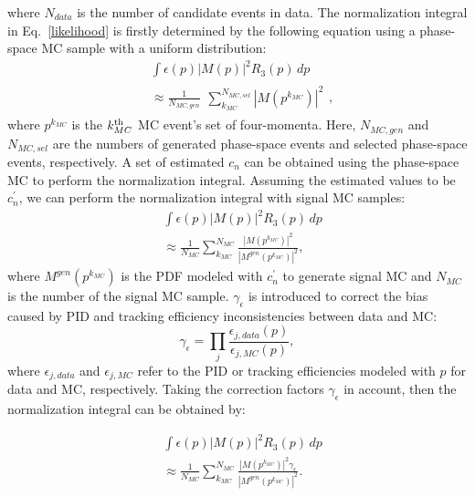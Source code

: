\documentclass[aps,prd,twocolumn,showpacs,amsmath,amssymb]{revtex4-1}
\begin{document}
where $N_{data}$ is the number of candidate events in data.
The normalization integral in Eq.~\ref{likelihood} is firstly determined by the following equation using a phase-space MC sample with a uniform distribution:
\begin{equation}
    \begin{aligned}
        &\int \epsilon(p)\left|M(p)\right|^{2}R_{3}(p)\,dp \\ 
        &\approx \frac{1}{N_{MC,gen}} \begin{matrix}\sum_{k_{MC}}^{N_{MC,sel}} \left|M(p^{k_{MC}})\right|^{2}\end{matrix},
    \end{aligned}
    \label{MC-intergral}
\end{equation}
where $p^{k_{MC}}$ is the $k_{MC}^{\rm th}$ MC event's set of four-momenta.
Here, $N_{MC,gen}$ and $N_{MC,sel}$ are the numbers of generated phase-space events and selected phase-space events, respectively.
A set of estimated $c_{n}$ can be obtained using the phase-space MC to perform the normalization integral.
Assuming the estimated values to be $c_{n}^{'}$, we can perform the normalization integral with signal MC samples:
\begin{equation}
    \begin{aligned}
        &\int \epsilon(p)\left|M(p)\right|^{2}R_{3}(p)\,dp \\ 
        &\approx \frac{1}{N_{MC}} \sum_{k_{MC}}^{N_{MC}} \frac{\left|M(p^{k_{MC}})\right|^{2}} { \left|M^{gen}(p^{k_{MC}})\right|^{2} }, 
    \end{aligned}
\label{sig-MC-intergral}
\end{equation}
where $M^{gen}(p^{k_{MC}})$ is the PDF modeled with $c_{n}^{'}$ to generate signal MC and $N_{MC}$ is the number of the signal MC sample.
$\gamma_{\epsilon}$ is introduced to correct the bias caused by PID and tracking efficiency inconsistencies between data and MC:
\begin{equation}
    \gamma_{\epsilon} = \prod_{j} \frac{\epsilon_{j, data}(p)}{\epsilon_{j, MC}(p)}, \label{experimental-effect}
\end{equation}
where $\epsilon_{j, data}$ and $\epsilon_{j, MC}$ refer to the PID or tracking efficiencies modeled with $p$ for data and MC, respectively.
Taking the correction factors $\gamma_{\epsilon}$ in account, then the normalization integral can be obtained by:

\begin{equation}
    \begin{aligned}
        &\int \epsilon(p)\left|M(p)\right|^{2}R_{3}(p)\,dp \\ 
        &\approx \frac{1}{N_{MC}} \sum_{k_{MC}}^{N_{MC}} \frac{\left|M(p^{k_{MC}})\right|^{2}\gamma_{\epsilon}} { \left|M^{gen}(p^{k_{MC}})\right|^{2} }. 
    \end{aligned}
\label{sig-MC-intergral-correction}
\end{equation}
\end{document}
